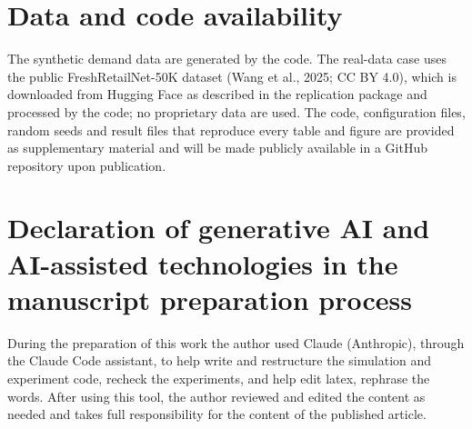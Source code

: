 \documentclass[11pt,a4paper]{article}
\begin{document}
\section*{Data and code availability}
The synthetic demand data are generated by the code. The real-data case uses the public FreshRetailNet-50K dataset (Wang et al., 2025; CC BY 4.0), which is downloaded from Hugging Face as described in the replication package and processed by the code; no proprietary data are used. The code, configuration files, random seeds and result files that reproduce every table and figure are provided as supplementary material and will be made publicly available in a GitHub repository upon publication.

\section*{Declaration of generative AI and AI-assisted technologies in the manuscript preparation process}
During the preparation of this work the author used Claude (Anthropic), through the Claude Code assistant, to help write and restructure the simulation and experiment code, recheck the experiments, and help edit latex, rephrase the words. After using this tool, the author reviewed and edited the content as needed and takes full responsibility for the content of the published article.
\end{document}
